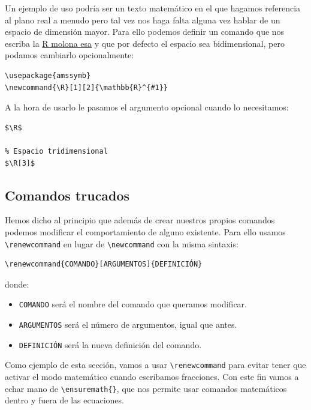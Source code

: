 Un ejemplo de uso podría ser un texto matemático en el que hagamos
referencia al plano real a menudo pero tal vez nos haga falta alguna vez
hablar de un espacio de dimensión mayor. Para ello podemos definir un
comando que nos escriba la
\href{https://en.wikipedia.org/wiki/Real_number\#/media/File:Latex_real_numbers.svg}{R
molona esa} y que por defecto el espacio sea bidimensional, pero podamos
cambiarlo opcionalmente:

\begin{lstlisting}[language={[latex]tex}]
\usepackage{amssymb}
\newcommand{\R}[1][2]{\mathbb{R}^{#1}}
\end{lstlisting}

A la hora de usarlo le pasamos el argumento opcional cuando lo
necesitamos:

\begin{lstlisting}[language={[latex]tex}]
% Espacio bidimensional
$\R$

% Espacio tridimensional
$\R[3]$
\end{lstlisting}

\subsection{Comandos trucados}

Hemos dicho al principio que además de crear nuestros propios comandos
podemos modificar el comportamiento de alguno existente. Para ello
usamos \lstinline!\renewcommand! en lugar de \lstinline!\newcommand! con
la misma sintaxis:

\begin{lstlisting}[language={[latex]tex}]
\renewcommand{COMANDO}[ARGUMENTOS]{DEFINICIÓN}
\end{lstlisting}

donde:

\begin{itemize}
\item
  \lstinline!COMANDO! será el nombre del comando que queramos modificar.
\item
  \lstinline!ARGUMENTOS! será el número de argumentos, igual que antes.
\item
  \lstinline!DEFINICIÓN! será la nueva definición del comando.
\end{itemize}

Como ejemplo de esta sección, vamos a usar \lstinline!\renewcommand!
para evitar tener que activar el modo matemático cuando escribamos
fracciones. Con este fin vamos a echar mano de
\lstinline!\ensuremath{}!,
que nos permite usar comandos matemáticos dentro y fuera de las
ecuaciones.

